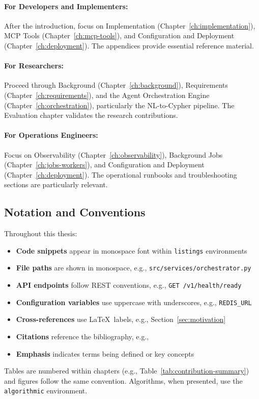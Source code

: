 \paragraph{For Developers and Implementers:}
After the introduction, focus on Implementation (Chapter~\ref{ch:implementation}), MCP Tools (Chapter~\ref{ch:mcp-tools}), and Configuration and Deployment (Chapter~\ref{ch:deployment}). The appendices provide essential reference material.

\paragraph{For Researchers:}
Proceed through Background (Chapter~\ref{ch:background}), Requirements (Chapter~\ref{ch:requirements}), and the Agent Orchestration Engine (Chapter~\ref{ch:orchestration}), particularly the NL-to-Cypher pipeline. The Evaluation chapter validates the research contributions.

\paragraph{For Operations Engineers:}
Focus on Observability (Chapter~\ref{ch:observability}), Background Jobs (Chapter~\ref{ch:jobs-workers}), and Configuration and Deployment (Chapter~\ref{ch:deployment}). The operational runbooks and troubleshooting sections are particularly relevant.

\subsection{Notation and Conventions}

Throughout this thesis:

\begin{itemize}
    \item \textbf{Code snippets} appear in monospace font within \lstinline{listings} environments
    \item \textbf{File paths} are shown in monospace, e.g., \texttt{src/services/orchestrator.py}
    \item \textbf{API endpoints} follow REST conventions, e.g., \texttt{GET /v1/health/ready}
    \item \textbf{Configuration variables} use uppercase with underscores, e.g., \texttt{REDIS\_URL}
    \item \textbf{Cross-references} use \LaTeX\ labels, e.g., Section~\ref{sec:motivation}
    \item \textbf{Citations} reference the bibliography, e.g., \cite{openai2023gpt4}
    \item \textbf{Emphasis} indicates terms being defined or key concepts
\end{itemize}

Tables are numbered within chapters (e.g., Table~\ref{tab:contribution-summary}) and figures follow the same convention. Algorithms, when presented, use the \texttt{algorithmic} environment.

